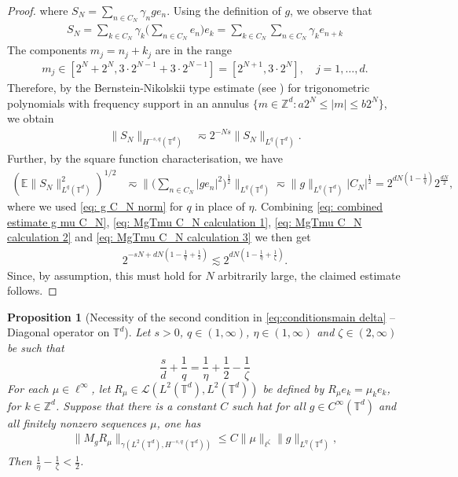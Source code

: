 \documentclass[reqno]{amsart}
\theoremstyle{plain}
\theoremstyle{remark}
\theoremstyle{plain}
\newtheorem{proposition}[theorem]{Proposition}
\numberwithin{equation}{section}
\newcommand\calL{\mathcal{L}}
\def\Z{{\mathbb Z}}
\newcommand{\E}{{\mathbb E}}
\newcommand{\T}{\mathbb{T}}
\newcommand{\1}{\one}
\begin{document}
\begin{proof}
where $S_N = \sum_{n \in C_N} \gamma_n g e_n$.
Using the definition of $g$, we observe that
\begin{align}
S_N = \sum_{k \in C_N} \gamma_k \Big(\sum_{n \in C_N} e_n \Big) e_k = \sum_{k \in C_N} \sum_{n \in C_N} \gamma_k e_{n+k}
\end{align}
The components $m_j = n_j + k_j$ are in the range 
\begin{align}
m_j\in [2^N+2^N, 3 \cdot 2^{N-1} + 3 \cdot 2^{N-1}] = [2^{N+1}, 3 \cdot 2^N],\quad j=1,\dots,d.
\end{align}
Therefore, by the Bernstein-Nikolskii type estimate (see \cite[Section 2.1.1]{BCD}) for trigonometric polynomials with frequency support in an annulus $\{m\in \Z^d: a 2^{N} \leq |m|\leq b 2^{N}\}$, we obtain
\begin{align}
    \|S_N\|_{H^{-s,q}(\T^d)} &
\label{eq: MgTmu C_N calculation 2}
    \eqsim 2^{-Ns} \|S_N\|_{L^q(\T^d)}.
\end{align}
Further, by the square function characterisation, we have
\begin{align}
\label{eq: MgTmu C_N calculation 3}
    (\E\|S_N\|_{L^q(\T^d)}^2)^{1/2}&\eqsim \Big\|\Big(\sum_{n\in C_N}|ge_n|^2\Big)^{\frac{1}{2}} \Big\|_{L^q(\T^d)} \eqsim \|g\|_{L^q(\T^d)}|C_N|^{\frac{1}{2}}  = 2^{dN( 1-\frac{1}{q})}2^{\frac{dN}{2}},
\end{align}
where we used \eqref{eq: g C_N norm} for $q$ in place of $\eta$. Combining \eqref{eq: combined estimate g mu C_N}, \eqref{eq: MgTmu C_N calculation 1}, \eqref{eq: MgTmu C_N calculation 2} and \eqref{eq: MgTmu C_N calculation 3} we then get
\begin{align}
   2^{-sN + dN( 1-\frac{1}{q} + \frac{1}{2})}\lesssim  2^{dN(1-\frac{1}{\eta}+\frac{1}{\zeta} )}.
\end{align}
Since, by assumption, this must hold for $N$ arbitrarily large, the claimed estimate follows.
\end{proof}


\begin{proposition}[Necessity of the second condition in \eqref{eq:conditionsmain delta} -- Diagonal operator on $\T^d$]\label{p:necessityweirdcond}
Let $s>0$, $q\in (1, \infty)$, $\eta\in (1, \infty)$ and $\zeta\in(2,\infty)$ be such that 
\[
        \frac{s}{d} + \frac{1}{q}  = \frac{1}{\eta} + \frac{1}{2} - \frac{1}{\zeta}
\]
For each $\mu\in \ell^\infty$, let $R_{\mu}\in \calL(L^2(\T^d),L^2(\T^d))$ be defined by $R_{\mu} e_k = \mu_k e_k$, for   $k\in \Z^d$.
Suppose that there is a constant $C$ such hat for all $g\in C^\infty(\T^d)$ and all finitely nonzero sequences $\mu$, one has
\begin{align}
\label{eq:assumption_optimality_conditions_eta_zeta12}
\|M_g R_\mu \|_{\gamma(L^2(\T^d),H^{-s,q}(\T^d))}\leq C \|\mu\|_{\ell^{\zeta}} \|g\|_{L^{\eta}(\T^d)},
\end{align}
Then $\frac1\eta-\frac1\zeta<\frac12$. 
\end{proposition}
\end{document}
